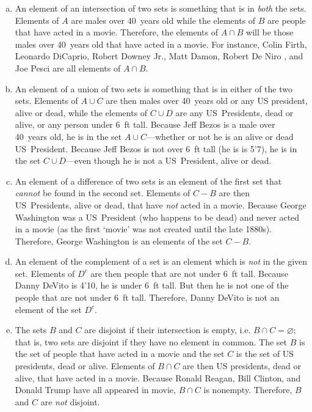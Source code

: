 \documentclass[11pt,letterpaper]{article}
\begin{document}
\begin{enumerate}[(a)]
\item An element of an intersection of two sets is something that is in \textit{both} the sets. Elements of $A$ are males over 40~years old while the elements of $B$ are people that have acted in a movie. Therefore, the elements of $A \cap B$ will be those males over 40~years old that have acted in a movie. For instance, Colin Firth, Leonardo DiCaprio, Robert Downey Jr., Matt Damon, Robert De Niro , and Joe Pesci are all elements of $A \cap B$. \pspace

\item An element of a union of two sets is something that is in either of the two sets. Elements of $A \cup C$ are then males over 40~years old or any US president, alive or dead, while the elements of $C \cup D$ are any US~Presidents, dead or alive, or any person under 6~ft tall. Because Jeff Bezos is a male over 40~years old, he is in the set $A \cup C$---whether or not he is an alive or dead US~President. Because Jeff Bezos is not over 6~ft tall (he is is 5'7), he is in the set $C \cup D$---even though he is not a US~President, alive or dead. \pspace

\item An element of a difference of two sets is an element of the first set that \textit{cannot} be found in the second set. Elements of $C - B$ are then US~Presidents, alive or dead, that have \textit{not} acted in a movie. Because George Washington was a US~President (who happens to be dead) and never acted in a movie (as the first `movie' was not created until the late 1880s). Therefore, George Washington is an elements of the set $C - B$. \pspace

\item An element of the complement of a set is an element which is \textit{not} in the given set. Elements of $D^c$ are then people that are not under 6~ft tall. Because Danny DeVito is 4'10, he is under 6~ft tall. But then he is not one of the people that are not under 6~ft tall. Therefore, Danny DeVito is not an element of the set $D^c$. 

\item The sets $B$ and $C$ are disjoint if their intersection is empty, i.e. $B \cap C= \varnothing$; that is, two sets are disjoint if they have no element in common. The set $B$ is the set of people that have acted in a movie and the set $C$ is the set of US presidents, dead or alive. Elements of $B \cap C$ are then US presidents, dead or alive, that have acted in a movie. Because Ronald Reagan, Bill Clinton, and Donald Trump have all appeared in movie, $B \cap C$ is nonempty. Therefore, $B$ and $C$ are \textit{not} disjoint. 
\end{enumerate}
\end{document}
